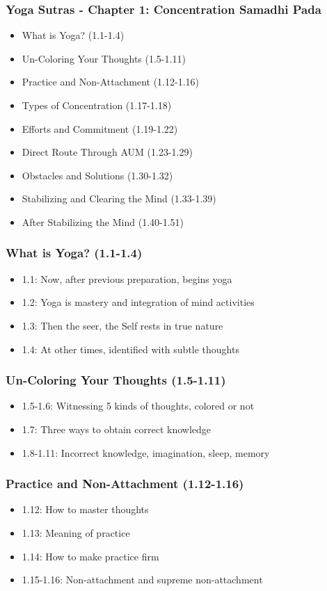 \begin{frame}[fragile]\frametitle{Yoga Sutras - Chapter 1: Concentration Samadhi Pada}
\begin{itemize}
\item What is Yoga? (1.1-1.4)
\item Un-Coloring Your Thoughts (1.5-1.11)
\item Practice and Non-Attachment (1.12-1.16)
\item Types of Concentration (1.17-1.18)
\item Efforts and Commitment (1.19-1.22)
\item Direct Route Through AUM (1.23-1.29)
\item Obstacles and Solutions (1.30-1.32)
\item Stabilizing and Clearing the Mind (1.33-1.39)
\item After Stabilizing the Mind (1.40-1.51)
\end{itemize}
\end{frame}

\begin{frame}[fragile]\frametitle{What is Yoga? (1.1-1.4)}
\begin{itemize}
\item 1.1: Now, after previous preparation, begins yoga
\item 1.2: Yoga is mastery and integration of mind activities
\item 1.3: Then the seer, the Self rests in true nature  
\item 1.4: At other times, identified with subtle thoughts
\end{itemize}
\end{frame}

\begin{frame}[fragile]\frametitle{Un-Coloring Your Thoughts (1.5-1.11)}
\begin{itemize}
\item 1.5-1.6: Witnessing 5 kinds of thoughts, colored or not
\item 1.7: Three ways to obtain correct knowledge
\item 1.8-1.11: Incorrect knowledge, imagination, sleep, memory
\end{itemize}
\end{frame}

\begin{frame}[fragile]\frametitle{Practice and Non-Attachment (1.12-1.16)}
\begin{itemize}
\item 1.12: How to master thoughts
\item 1.13: Meaning of practice
\item 1.14: How to make practice firm
\item 1.15-1.16: Non-attachment and supreme non-attachment
\end{itemize}
\end{frame}

